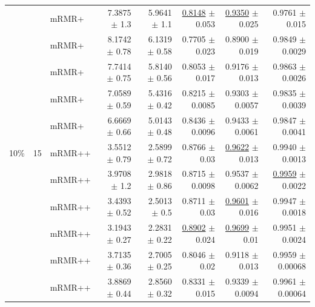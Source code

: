 \begin{longtable}{llp{}rrrrr}
 &  & mRMR+ & 7.3875 {\scriptsize $\pm$ 1.3} & 5.9641 {\scriptsize $\pm$ 1.1} & \underline{0.8148} {\scriptsize $\pm$ 0.053} & \underline{0.9350} {\scriptsize $\pm$ 0.025} & 0.9761 {\scriptsize $\pm$ 0.015} \\
 &  & mRMR+ & 8.1742 {\scriptsize $\pm$ 0.78} & 6.1319 {\scriptsize $\pm$ 0.58} & 0.7705 {\scriptsize $\pm$ 0.023} & 0.8900 {\scriptsize $\pm$ 0.019} & 0.9849 {\scriptsize $\pm$ 0.0029} \\
 &  & mRMR+ & 7.7414 {\scriptsize $\pm$ 0.75} & 5.8140 {\scriptsize $\pm$ 0.56} & 0.8053 {\scriptsize $\pm$ 0.017} & 0.9176 {\scriptsize $\pm$ 0.013} & 0.9863 {\scriptsize $\pm$ 0.0026} \\
 &  & mRMR+ & 7.0589 {\scriptsize $\pm$ 0.59} & 5.4316 {\scriptsize $\pm$ 0.42} & 0.8215 {\scriptsize $\pm$ 0.0085} & 0.9303 {\scriptsize $\pm$ 0.0057} & 0.9835 {\scriptsize $\pm$ 0.0039} \\
 &  & mRMR+ & 6.6669 {\scriptsize $\pm$ 0.66} & 5.0143 {\scriptsize $\pm$ 0.48} & 0.8436 {\scriptsize $\pm$ 0.0096} & 0.9433 {\scriptsize $\pm$ 0.0061} & 0.9847 {\scriptsize $\pm$ 0.0041} \\
\midrule
10\% & 15 & mRMR++ & 3.5512 {\scriptsize $\pm$ 0.79} & 2.5899 {\scriptsize $\pm$ 0.72} & 0.8766 {\scriptsize $\pm$ 0.03} & \underline{0.9622} {\scriptsize $\pm$ 0.013} & 0.9940 {\scriptsize $\pm$ 0.0013} \\
 &  & mRMR++ & 3.9708 {\scriptsize $\pm$ 1.2} & 2.9818 {\scriptsize $\pm$ 0.86} & 0.8715 {\scriptsize $\pm$ 0.0098} & 0.9537 {\scriptsize $\pm$ 0.0062} & \underline{0.9959} {\scriptsize $\pm$ 0.0022} \\
 &  & mRMR++ & 3.4393 {\scriptsize $\pm$ 0.52} & 2.5013 {\scriptsize $\pm$ 0.5} & 0.8711 {\scriptsize $\pm$ 0.03} & \underline{0.9601} {\scriptsize $\pm$ 0.016} & 0.9947 {\scriptsize $\pm$ 0.0018} \\
 &  & mRMR++ & 3.1943 {\scriptsize $\pm$ 0.27} & 2.2831 {\scriptsize $\pm$ 0.22} & \underline{0.8902} {\scriptsize $\pm$ 0.024} & \underline{0.9699} {\scriptsize $\pm$ 0.01} & 0.9951 {\scriptsize $\pm$ 0.0024} \\
 &  & mRMR++ & 3.7135 {\scriptsize $\pm$ 0.36} & 2.7005 {\scriptsize $\pm$ 0.25} & 0.8046 {\scriptsize $\pm$ 0.02} & 0.9118 {\scriptsize $\pm$ 0.013} & 0.9959 {\scriptsize $\pm$ 0.00068} \\
 &  & mRMR++ & 3.8869 {\scriptsize $\pm$ 0.44} & 2.8560 {\scriptsize $\pm$ 0.32} & 0.8331 {\scriptsize $\pm$ 0.015} & 0.9339 {\scriptsize $\pm$ 0.0094} & 0.9961 {\scriptsize $\pm$ 0.00064} \\

\end{longtable}
